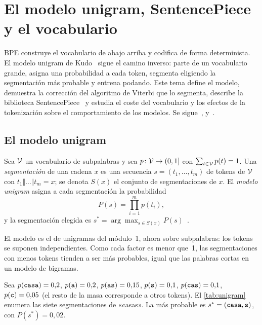 \chapter{El modelo unigram, SentencePiece y el vocabulario}
\label{tema:3}

BPE construye el vocabulario de abajo arriba y codifica de forma determinista. El modelo unigram de Kudo~\cite{kudo} sigue el camino inverso: parte de un vocabulario grande, asigna una probabilidad a cada token, segmenta eligiendo la segmentación más probable y entrena podando. Este tema define el modelo, demuestra la corrección del algoritmo de Viterbi que lo segmenta, describe la biblioteca SentencePiece~\cite{sentencepiece} y estudia el coste del vocabulario y los efectos de la tokenización sobre el comportamiento de los modelos. Se sigue~\cite[§3.2--3.4]{kudo}, \cite[§3]{sentencepiece} y~\cite[§2.4.3]{jm3}.

\section{El modelo unigram}

\begin{definicion}\label{def:unigram}
Sea $\mathcal{V}$ un vocabulario de subpalabras y sea $p\colon\mathcal{V}\to(0,1]$ con $\sum_{t\in\mathcal{V}}p(t)=1$. Una \emph{segmentación} de una cadena $x$ es una secuencia $s=(t_1,\dots,t_m)$ de tokens de $\mathcal{V}$ con $t_1\Vert\dots\Vert t_m=x$; se denota $S(x)$ el conjunto de segmentaciones de $x$. El \emph{modelo unigram} asigna a cada segmentación la probabilidad
\[
P(s)=\prod_{i=1}^{m}p(t_i),
\]
y la segmentación elegida es $s^{*}=\arg\max_{s\in S(x)}P(s)$~\cite[§3.2]{kudo}.
\end{definicion}

El modelo es el de unigramas del módulo~1, ahora sobre subpalabras: los tokens se suponen independientes. Como cada factor es menor que~1, las segmentaciones con menos tokens tienden a ser más probables, igual que las palabras cortas en un modelo de bigramas.

\begin{ejemplo}\label{ej:unigram}
Sea $p(\texttt{casa})=0{,}2$, $p(\texttt{a})=0{,}2$, $p(\texttt{as})=0{,}15$, $p(\texttt{s})=0{,}1$, $p(\texttt{cas})=0{,}1$, $p(\texttt{c})=0{,}05$ (el resto de la masa corresponde a otros tokens). El \cref{tab:unigram} enumera las siete segmentaciones de «casas». La más probable es $s^{*}=(\texttt{casa},\texttt{s})$, con $P(s^{*})=0{,}02$.
\end{ejemplo}

